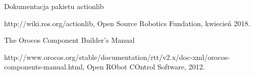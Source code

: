 \documentclass[a4paper, 12pt]{article}
\begin{document}
\newpage	
\begin{thebibliography}{9}
Dokumentacja pakietu actionlib

http://wiki.ros.org/actionlib, Open Source Robotics Fundation, kwiecień 2018.







The Orocos Component Builder's Manual

 http://www.orocos.org/stable/documentation/rtt/v2.x/doc-xml/orocos-components-manual.html, Open RObot COntrol Software, 2012.
\end{thebibliography}	
	
\end{document}
